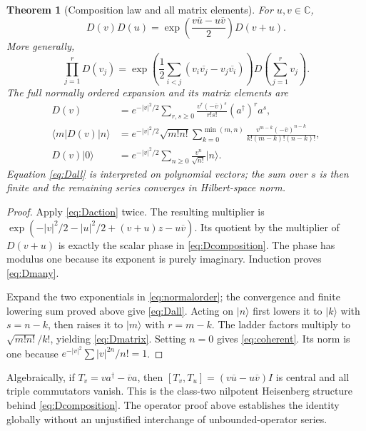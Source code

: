 \documentclass[11pt]{article}
\newtheorem{theorem}{Theorem}[section]
\theoremstyle{definition}
\theoremstyle{remark}
\newcommand{\C}{\mathbb C}
\numberwithin{equation}{section}
\begin{document}
\begin{theorem}[Composition law and all matrix elements]\label{thm:Dcomposition}
For $u,v\in\C$,
\begin{equation}\label{eq:Dcomposition}
 D(v)D(u)=
  \exp\!\left(\frac{v\overline u-u\overline v}{2}\right)D(v+u).
\end{equation}
More generally,
\begin{equation}\label{eq:Dmany}
 \prod_{j=1}^{r}D(v_j)=
  \exp\!\left(\frac12\sum_{i<j}
                (v_i\overline{v_j}-v_j\overline{v_i})\right)
       D\!\left(\sum_{j=1}^{r}v_j\right).
\end{equation}
The full normally ordered expansion and its matrix elements are
\begin{align}
 D(v)&=e^{-|v|^2/2}
       \sum_{r,s\geq0}\frac{v^r(-\overline v)^s}{r!s!}
                              (a^\dagger)^ra^s,\label{eq:Dall}\\
 \langle m|D(v)|n\rangle
   &=e^{-|v|^2/2}\sqrt{m!n!}
       \sum_{k=0}^{\min(m,n)}
       \frac{v^{m-k}(-\overline v)^{n-k}}
            {k!(m-k)!(n-k)!},\label{eq:Dmatrix}\\
 D(v)|0\rangle&=e^{-|v|^2/2}
                   \sum_{n\geq0}\frac{v^n}{\sqrt{n!}}|n\rangle.
                   \label{eq:coherent}
\end{align}
Equation \eqref{eq:Dall} is interpreted on polynomial vectors; the sum over $s$ is then finite and the remaining series converges in Hilbert-space norm.
\end{theorem}
\begin{proof}
Apply \eqref{eq:Daction} twice. The resulting multiplier is
$\exp(-|v|^2/2-|u|^2/2+(v+u)z-u\overline v)$.
Its quotient by the multiplier of $D(v+u)$ is exactly the scalar phase in \eqref{eq:Dcomposition}. The phase has modulus one because its exponent is purely imaginary. Induction proves \eqref{eq:Dmany}.

Expand the two exponentials in \eqref{eq:normalorder}; the convergence and finite lowering sum proved above give \eqref{eq:Dall}. Acting on $|n\rangle$ first lowers it to $|k\rangle$ with $s=n-k$, then raises it to $|m\rangle$ with $r=m-k$. The ladder factors multiply to $\sqrt{m!n!}/k!$, yielding \eqref{eq:Dmatrix}. Setting $n=0$ gives \eqref{eq:coherent}. Its norm is one because $e^{-|v|^2}\sum |v|^{2n}/n!=1$.
\end{proof}
Algebraically, if $T_v=va^\dagger-\overline v a$, then
$[T_v,T_u]=(v\overline u-u\overline v)I$ is central and all triple commutators vanish. This is the class-two nilpotent Heisenberg structure behind \eqref{eq:Dcomposition}. The operator proof above establishes the identity globally without an unjustified interchange of unbounded-operator series.
\end{document}
